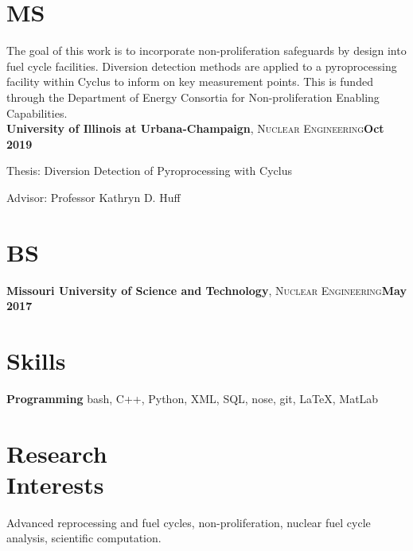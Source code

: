 \documentclass[margin,line]{resume}
\begin{document}
\begin{resume}
    \section{\mysidestyle MS}
    The goal of this work is to incorporate non-proliferation safeguards by design into fuel cycle facilities. Diversion detection methods are applied to a pyroprocessing facility
    within Cyclus to inform on key measurement points. This is funded through the
    Department of Energy Consortia for Non-proliferation Enabling Capabilities.\\
    \textbf{University of Illinois at Urbana-Champaign}, \textsc{Nuclear Engineering}\hfill \textbf{Oct 2019}\vspace{-3mm}\\\vspace{-1mm}%
    \begin{list2}
        \item Thesis: Diversion Detection of Pyroprocessing with Cyclus
        \item Advisor:  Professor Kathryn D. Huff
    \end{list2}\vspace{-1.5mm}
    \section{\mysidestyle BS}
    \textbf{Missouri University of Science and Technology}, \textsc{Nuclear Engineering}\hfill\textbf{May 2017}\vspace{-3mm}\\\vspace{-1mm}%
    \section{\mysidestyle Skills}
    \textbf{Programming} \hfill bash, C++, Python, XML, SQL, nose, git, \LaTeX, MatLab%
    \section{\mysidestyle Research\\Interests}
    Advanced reprocessing and fuel cycles, non-proliferation, 
    nuclear fuel cycle analysis, scientific computation.

\end{resume}
\end{document}

